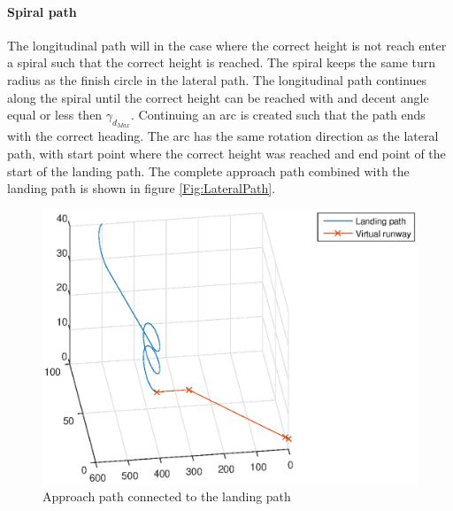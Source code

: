 \paragraph{Spiral path}
The longitudinal path will in the case where the correct height is not reach enter a spiral such that the correct height is reached. The spiral keeps the same turn radius as the finish circle in the lateral path. The longitudinal path continues along the spiral until the correct height can be reached with and decent angle equal or less then $\gamma_{d_{Max}}$. Continuing an arc is created such that the path ends with the correct heading. The arc has the same rotation direction as the lateral path, with start point where the correct height was reached and end point of the start of the landing path. The complete approach path combined with the landing path is shown in figure \ref{Fig:LateralPath}.
\begin{figure}[H]
	\centering
		\includegraphics[width=1\textwidth]{figs/SysPlot/LandingPath.eps}
		\caption{Approach path connected to the landing path}
		\label{Fig:LandingPath}
\end{figure}
